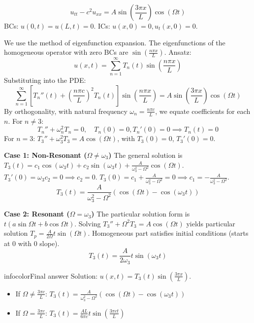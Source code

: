 \documentclass[a4paper,11pt]{article} %
\newenvironment{summarybox}[1][]{\begin{custombox}[#1]{infocolor}{Final answer}}{\end{custombox}}
\begin{document}
\begin{problembox}
$$u_{tt} - c^2 u_{xx} = A \sin\left(\frac{3\pi x}{L}\right)\cos(\Omega t)$$
BCs: $u(0, t) = u(L, t) = 0$. ICs: $u(x, 0) = 0, u_t(x, 0) = 0$.
\end{problembox}


We use the method of eigenfunction expansion. The eigenfunctions of the homogeneous operator with zero BCs are $\sin\left(\frac{n\pi x}{L}\right)$.
Ansatz:
$$ u(x,t) = \sum_{n=1}^{\infty} T_n(t) \sin\left(\frac{n\pi x}{L}\right) $$
Substituting into the PDE:
$$ \sum_{n=1}^{\infty} \left[ T_n''(t) + \left(\frac{n\pi c}{L}\right)^2 T_n(t) \right] \sin\left(\frac{n\pi x}{L}\right) = A \sin\left(\frac{3\pi x}{L}\right)\cos(\Omega t) $$
By orthogonality, with natural frequency $\omega_n = \tfrac{n\pi c}{L}$, we equate coefficients for each $n$.
For $n \neq 3$:
$$ T_n'' + \omega_n^2 T_n = 0, \quad T_n(0)=0, T_n'(0)=0 \implies T_n(t) = 0 $$
For $n = 3$: $T_3'' + \omega_3^2 T_3 = A\cos(\Omega t)$, with $T_3(0)=0$, $T_3'(0)=0$.

\textbf{Case 1: Non-Resonant ($\Omega \neq \omega_3$)}
The general solution is $T_3(t) = c_1 \cos(\omega_3 t) + c_2 \sin(\omega_3 t) + \frac{A}{\omega_3^2 - \Omega^2}\cos(\Omega t)$.
$T_3'(0) = \omega_3 c_2 = 0 \implies c_2 = 0$.
$T_3(0) = c_1 + \frac{A}{\omega_3^2 - \Omega^2} = 0 \implies c_1 = - \frac{A}{\omega_3^2 - \Omega^2}$.
$$ T_3(t) = \frac{A}{\omega_3^2 - \Omega^2} (\cos(\Omega t) - \cos(\omega_3 t)) $$

\textbf{Case 2: Resonant ($\Omega = \omega_3$)}
The particular solution form is $t(a \sin \Omega t + b \cos \Omega t)$.
Solving $T_3'' + \Omega^2 T_3 = A \cos(\Omega t)$ yields particular solution $T_p = \frac{A}{2\Omega} t \sin(\Omega t)$.
Homogeneous part satisfies initial conditions (starts at 0 with 0 slope).
$$ T_3(t) = \frac{A}{2\omega_3} t \sin(\omega_3 t) $$

\begin{summarybox}
Solution: $u(x,t) = T_3(t) \sin\left(\frac{3\pi x}{L}\right)$.
\begin{itemize}
    \item If $\Omega \neq \frac{3\pi c}{L}$: $T_3(t) = \frac{A}{\omega_3^2 - \Omega^2} (\cos(\Omega t) - \cos(\omega_3 t))$
    \item If $\Omega = \frac{3\pi c}{L}$: $T_3(t) = \frac{A L}{6\pi c} t \sin\left(\frac{3\pi c t}{L}\right)$
\end{itemize}
\end{summarybox}

\newpage
\end{document}
